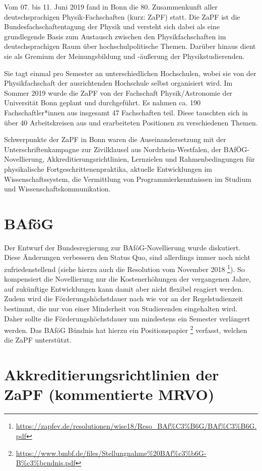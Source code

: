 Vom 07. bis 11. Juni 2019 fand in Bonn die 80. Zusammenkunft aller deutschsprachigen Physik-Fachschaften (kurz: ZaPF) statt.
Die ZaPF ist die Bundesfachschaftentagung der Physik und versteht sich dabei als eine grundlegende Basis zum Austausch zwischen den Physikfachschaften im deutschsprachigen Raum über hochschulpolitische Themen. Darüber hinaus dient sie als Gremium der Meinungsbildung und -äußerung der Physikstudierenden.

Sie tagt einmal pro Semester an unterschiedlichen Hochschulen, wobei sie von der Physikfachschaft der ausrichtenden Hochschule selbst organisiert wird. 
Im Sommer 2019 wurde die ZaPF von der Fachschaft Physik/Astronomie der Universität Bonn geplant und durchgeführt.  
Es nahmen ca. 190 Fachschaftler*innen aus insgesamt 47 Fachschaften teil.
Diese tauschten sich in über 40 Arbeitskreisen aus und erarbeiteten Positionen zu verschiedenen Themen.

Schwerpunkte der ZaPF in Bonn waren die Auseinandersetzung mit der Unterschriftenkampagne zur Zivilklausel aus Nordrhein-Westfalen, 
der BAfÖG-Novellierung, Akkreditierungsrichtlinien, Lernzielen und Rahmenbedingungen für physikalische Fortgeschrittenenpraktika, aktuelle Entwicklungen im Wissenschaftssystem, die Vermittlung von Programmierkenntnissen im Studium und Wissenschaftskommunikation.

\section*{BAföG}

Der Entwurf der Bundesregierung zur BAföG-Novellierung wurde diskutiert.
Diese Änderungen verbessern den Status Quo, sind allerdings immer noch nicht zufriedenstellend (siehe hierzu auch die Resolution vom November 2018 \footnote{\url{https://zapfev.de/resolutionen/wise18/Reso\_BAf\%C3\%B6G/BAf\%C3\%B6G.pdf}}).
So kompensiert die Novellierung nur die Kostenerhöhungen der vergangenen Jahre, auf zukünftige Entwicklungen kann damit aber nicht flexibel reagiert werden. 
Zudem wird die Förderungshöchstdauer nach wie vor an der Regelstudienzeit bestimmt, die nur von einer Minderheit von Studierenden eingehalten wird. Daher sollte die Förderungshöchstdauer um mindestens ein Semester verlängert werden.
Das BAföG Bündnis hat hierzu ein Positionspapier \footnote{\url{https://www.bmbf.de/files/Stellungnahme\%20BAf\%c3\%b6G-B\%c3\%bcndnis.pdf}} verfasst, welchen die ZaPF unterstützt.
		
\section*{Akkreditierungsrichtlinien der ZaPF (kommentierte MRVO)}

